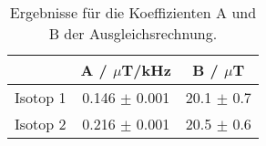 \begin{table}\centering\begin{tabular}{ccc} \toprule 
\centering
\caption{Ergebnisse für die Koeffizienten A und B der Ausgleichsrechnung.}
\label{tab:isoFit}
 & A / $\mu$T/kHz  & B / $\mu$T \\ \midrule
Isotop 1 & 0.146 $\pm$ 0.001 & 20.1 $\pm$ 0.7 \\
Isotop 2 & 0.216 $\pm$ 0.001 & 20.5 $\pm$ 0.6 \\
\bottomrule
\end{tabular}
\end{table}